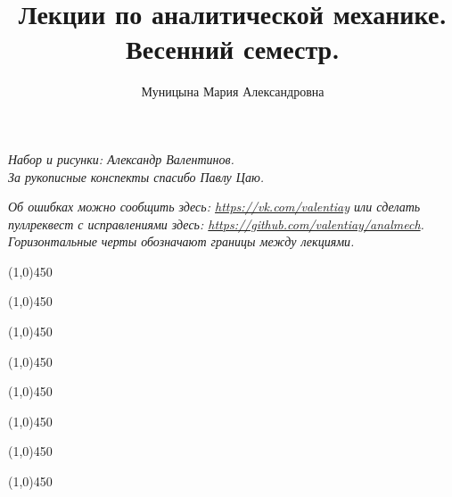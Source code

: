 \documentclass{article}
\author{Муницына Мария Александровна}
\title{Лекции по аналитической механике. Весенний семестр.}
\newcommand{\lline}{\begin{center}\line(1,0){450}\end{center}}
\begin{document}
  \label{title}
  \vfill
  \begin{titlepage}
  \maketitle
  \begin{center}

  {\itshape\small Набор и рисунки: Александр Валентинов.\\
  За рукописные конспекты спасибо Павлу Цаю.}
  \vspace{1em}

  {\itshape\small Об ошибках можно сообщить здесь: \url{https://vk.com/valentiay} или сделать \\ 
  пуллреквест с исправлениями здесь: \url{https://github.com/valentiay/analmech}.\\
  Горизонтальные черты обозначают границы между лекциями.}  
  \vfill

  \end{center}
  \thispagestyle{empty}
  \end{titlepage}

  \pagestyle{fancy}
  \renewcommand{\footrulewidth}{0.2mm}
  \fancyhead{}
  \fancyfoot[C]{\thepage}
  
  \pagebreak
  \tableofcontents
  \pagebreak
  
   \lline
   \lline
   \lline
   \lline
   \lline
   \lline
   \lline
   \lline
\end{document}
